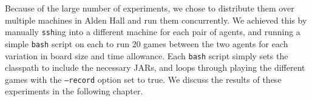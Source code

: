 Because of the large number of experiments, we chose to distribute them over multiple machines in Alden Hall and run them concurrently.  We achieved this by manually \texttt{ssh}ing into a different machine for each pair of agents, and running a simple \texttt{bash} script on each to run 20 games between the two agents for each variation in board size and time allowance.  Each \texttt{bash} script simply sets the classpath to include the necessary JARs, and loops through playing the different games with the \texttt{--record} option set to true.  We discuss the results of these experiments in the following chapter.